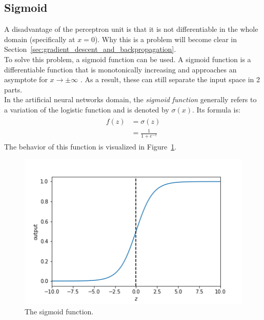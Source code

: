 \subsection{Sigmoid} %
\label{ssub:sigmoid}
A disadvantage of the perceptron unit is that it is not differentiable in the whole domain (specifically at $x=0$). Why this is a problem will become clear in Section~\ref{sec:gradient_descent_and_backpropagation}.\\
To solve this problem, a sigmoid function can be used. A sigmoid function is a differentiable function that is monotonically increasing and approaches an asymptote for $x \to \pm \infty$ \parencite{lecun2012neural}. As a result, these can still separate the input space in 2 parts.\\
In the artificial neural networks domain, the \textit{sigmoid function} generally refers to a variation of the logistic function and is denoted by $\sigma(x)$. Its formula is:
\begin{align}
    \begin{split}
        f(z) &= \sigma(z)\\
        &= \frac{1}{1+e^{-z}}
    \end{split}
\end{align}
The behavior of this function is visualized in Figure~\ref{fig:sigmoid}.
\begin{figure}[htb]
    \centering
    \includegraphics[width=.8\linewidth]{images/activation_functions/sigmoid.png}
    \caption[The sigmoid function]{The sigmoid function.}
    \label{fig:sigmoid}
\end{figure}

